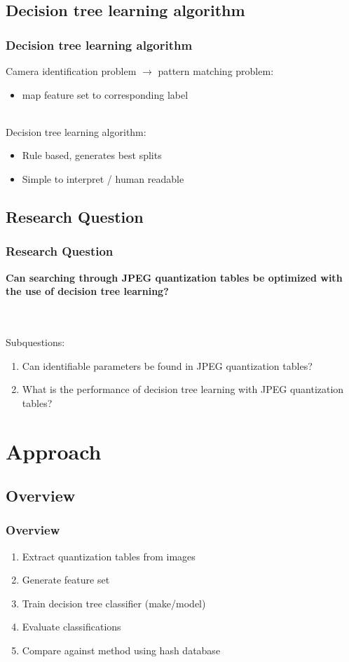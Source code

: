 \documentclass[10pt]{beamer}
\begin{document}
\subsection{Decision tree learning algorithm}
\begin{frame}
\frametitle{Decision tree learning algorithm}
Camera identification problem $\rightarrow$ pattern matching problem:\\
\begin{itemize}
\item map feature set to corresponding label
\end{itemize}
~\\
Decision tree learning algorithm:
\begin{itemize}
\item Rule based, generates best splits
\item Simple to interpret / human readable
\end{itemize}
\end{frame}

\subsection{Research Question}
\begin{frame}
\frametitle{Research Question}
\begin{center}
\textbf{\Large Can searching through JPEG quantization tables be optimized with the use of decision tree learning?} \\ ~\\
\end{center}
~\\
Subquestions:
\begin{enumerate}
\item Can identifiable parameters be found in JPEG quantization tables?
\item What is the performance of decision tree learning with JPEG quantization tables?
\end{enumerate}
\end{frame}




\section[Approach]{Approach}
\subsection{Overview}
\begin{frame}
\frametitle{Overview}
\begin{enumerate}
\item Extract quantization tables from images
\item Generate feature set
\item Train decision tree classifier (make/model) 
\item Evaluate classifications
\item Compare against method using hash database
\end{enumerate}
\end{frame}
\end{document}
